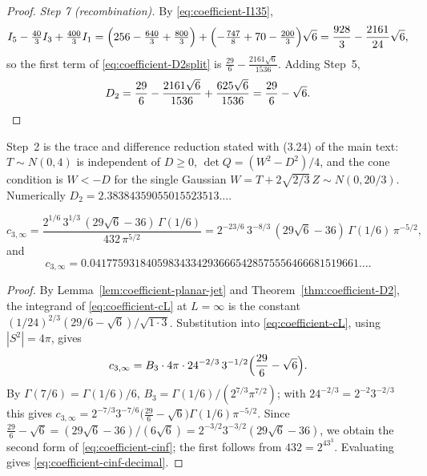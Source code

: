 \begin{proof}
\emph{Step 7 (recombination).} By \eqref{eq:coefficient-I135},
\[
I_5-\tfrac{40}{3}I_3+\tfrac{400}{3}I_1=\Bigl(256-\tfrac{640}{3}+\tfrac{800}{3}\Bigr)+\Bigl(-\tfrac{747}{8}+70-\tfrac{200}{3}\Bigr)\sqrt6=\frac{928}{3}-\frac{2161}{24}\sqrt6,
\]
so the first term of \eqref{eq:coefficient-D2split} is $\frac{29}{6}-\frac{2161\sqrt6}{1536}$. Adding Step~5,
\[
D_2=\frac{29}{6}-\frac{2161\sqrt6}{1536}+\frac{625\sqrt6}{1536}=\frac{29}{6}-\sqrt6 .\qedhere
\]
\end{proof}

\begin{remark}\label{rem:coefficient-D2check}
Step~2 is the trace and difference reduction stated with (3.24) of the main text: $T\sim N(0,4)$ is independent of $D\ge0$, $\det Q=(W^2-D^2)/4$, and the cone condition is $W<-D$ for the single Gaussian $W=T+2\sqrt{2/3}\,Z\sim N(0,20/3)$. Numerically $D_2=2.38384359055015523513\ldots$.
\end{remark}

\begin{corollary}\label{cor:coefficient-cinf}
\begin{equation}\label{eq:coefficient-cinf}
c_{3,\infty}=\frac{2^{1/6}\,3^{1/3}\,(29\sqrt6-36)\,\Gamma(1/6)}{432\,\pi^{5/2}}
=2^{-23/6}\,3^{-8/3}\,(29\sqrt6-36)\,\Gamma(1/6)\,\pi^{-5/2},
\end{equation}
and
\begin{equation}\label{eq:coefficient-cinf-decimal}
c_{3,\infty}=0.041775931840598343342936665428575556466681519661\ldots .
\end{equation}
\end{corollary}

\begin{proof}
By Lemma~\ref{lem:coefficient-planar-jet} and Theorem~\ref{thm:coefficient-D2}, the integrand of \eqref{eq:coefficient-cL} at $L=\infty$ is the constant $(1/24)^{2/3}(29/6-\sqrt6)/\sqrt{1\cdot3}$. Substitution into \eqref{eq:coefficient-cL}, using $|S^2|=4\pi$, gives
\[
c_{3,\infty}=B_3\cdot4\pi\cdot24^{-2/3}\,3^{-1/2}\Bigl(\frac{29}{6}-\sqrt6\Bigr).
\]
By $\Gamma(7/6)=\Gamma(1/6)/6$, $B_3=\Gamma(1/6)/(2^{7/3}\pi^{7/2})$; with $24^{-2/3}=2^{-2}3^{-2/3}$ this gives $c_{3,\infty}=2^{-7/3}3^{-7/6}\bigl(\frac{29}{6}-\sqrt6\bigr)\Gamma(1/6)\pi^{-5/2}$. Since $\frac{29}{6}-\sqrt6=(29\sqrt6-36)/(6\sqrt6)=2^{-3/2}3^{-3/2}(29\sqrt6-36)$, we obtain the second form of \eqref{eq:coefficient-cinf}; the first follows from $432=2^43^3$. Evaluating gives \eqref{eq:coefficient-cinf-decimal}.
\end{proof}

